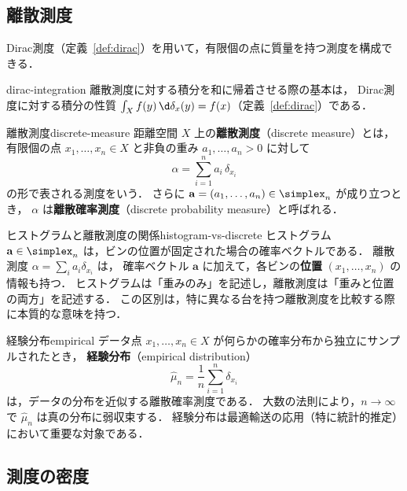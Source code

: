 \subsection{離散測度}
\label{subsec:discrete-measures}

Dirac測度（定義~\ref{def:dirac}）を用いて，有限個の点に質量を持つ測度を構成できる．

\begin{remark}{}{dirac-integration}
  離散測度に対する積分を和に帰着させる際の基本は，
  Dirac測度に対する積分の性質
  $\int_X f(y) \, \d\delta_x(y) = f(x)$（定義~\ref{def:dirac}）である．
\end{remark}

\begin{definition}{離散測度}{discrete-measure}
  距離空間 $X$ 上の\textbf{離散測度}（discrete measure）とは，
  有限個の点 $x_1, \ldots, x_n \in X$ と非負の重み $a_1, \ldots, a_n > 0$ に対して
  \[
    \alpha = \sum_{i=1}^n a_i \, \delta_{x_i}
  \]
  の形で表される測度をいう．
  さらに $\mathbf{a} = (a_1, \ldots, a_n) \in \simplex_n$ が成り立つとき，
  $\alpha$ は\textbf{離散確率測度}（discrete probability measure）と呼ばれる．
\end{definition}

\begin{remark}{ヒストグラムと離散測度の関係}{histogram-vs-discrete}
  ヒストグラム $\mathbf{a} \in \simplex_n$ は，ビンの位置が固定された場合の確率ベクトルである．
  離散測度 $\alpha = \sum_i a_i \delta_{x_i}$ は，
  確率ベクトル $\mathbf{a}$ に加えて，各ビンの\textbf{位置} $(x_1, \ldots, x_n)$ の情報も持つ．
  ヒストグラムは「重みのみ」を記述し，離散測度は「重みと位置の両方」を記述する．
  この区別は，特に異なる台を持つ離散測度を比較する際に本質的な意味を持つ．
\end{remark}

\begin{example}{経験分布}{empirical}
  データ点 $x_1, \ldots, x_n \in X$ が何らかの確率分布から独立にサンプルされたとき，
  \textbf{経験分布}（empirical distribution）
  \[
    \hat{\mu}_n = \frac{1}{n} \sum_{i=1}^n \delta_{x_i}
  \]
  は，データの分布を近似する離散確率測度である．
  大数の法則により，$n \to \infty$ で $\hat{\mu}_n$ は真の分布に弱収束する．
  経験分布は最適輸送の応用（特に統計的推定）において重要な対象である．
\end{example}

\subsection{測度の密度}
\label{subsec:density}

